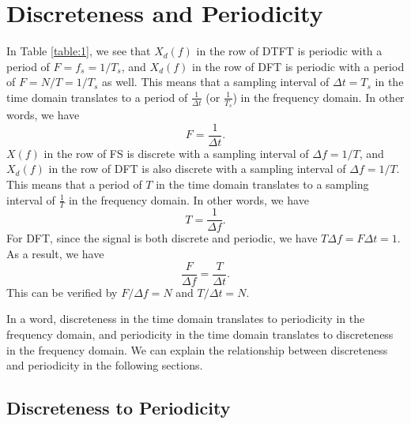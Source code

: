 \documentclass[journal,twoside]{IEEEtran}
\begin{document}
\section{Discreteness and Periodicity}
\label{sec:Discreteness_and_Periodicity}

In Table \ref{table:1}, we see that $X_d(f)$ in the row of DTFT is periodic with a period of $F = f_s = 1/T_s$, and $X_d(f)$ in the row of DFT is periodic with a period of $F = N/T = 1/T_s$ as well. This means that a sampling interval of $\Delta t = T_{s}$ in the time domain translates to a period of $\frac{1}{\Delta t}$ (or $\frac{1}{T_{s}}$) in the frequency domain. In other words, we have
\begin{equation}
F = \frac{1}{\Delta t}.
\end{equation}
$X(f)$ in the row of FS is discrete with a sampling interval of $\Delta f = 1/T$, and $X_d(f)$ in the row of DFT is also discrete with a sampling interval of $\Delta f = 1/T$. This means that a period of $T$ in the time domain translates to a sampling interval of $\frac{1}{T}$ in the frequency domain. In other words, we have
\begin{equation}
T = \frac{1}{\Delta f}.
\end{equation}
For DFT, since the signal is both discrete and periodic, we have $T\Delta f = F\Delta t = 1$. As a result, we have
\begin{equation}
\frac{F}{\Delta f} = \frac{T}{\Delta t}.
\end{equation}
This can be verified by $F/\Delta f = N$ and $T/\Delta t = N$.

In a word, discreteness in the time domain translates to periodicity in the frequency domain, and periodicity in the time domain translates to discreteness in the frequency domain. We can explain the relationship between discreteness and periodicity in the following sections.

\subsection{Discreteness to Periodicity}
\end{document}
